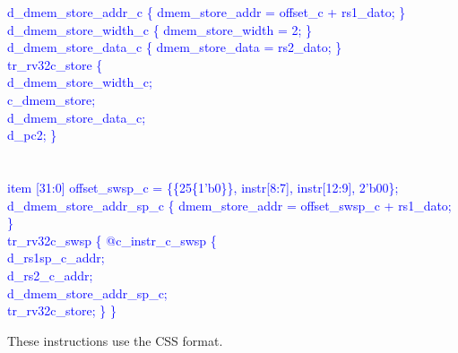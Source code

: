 \textcolor{blue}{
\indent d\_dmem\_store\_addr\_c \{ dmem\_store\_addr = offset\_c + rs1\_dato; \}\\%
\indent d\_dmem\_store\_width\_c \{ dmem\_store\_width = 2; \}\\%
\indent d\_dmem\_store\_data\_c \{ dmem\_store\_data = rs2\_dato; \}\\%
\indent tr\_rv32c\_store \{ \\%
\indent \hspace{\parindent} d\_dmem\_store\_width\_c; \\%
\indent \hspace{\parindent} c\_dmem\_store; \\%
\indent \hspace{\parindent} d\_dmem\_store\_data\_c; \\%
\indent \hspace{\parindent} d\_pc2; \}\\%
\\
\\
\indent item [31:0] offset\_swsp\_c = \{\{25\{1'b0\}\}, instr[8:7], instr[12:9], 2'b00\};\\%
\indent d\_dmem\_store\_addr\_sp\_c \{ dmem\_store\_addr = offset\_swsp\_c + rs1\_dato; \}\\%
\indent tr\_rv32c\_swsp \{ @c\_instr\_c\_swsp \{ \\%
\indent \hspace{\parindent} d\_rs1sp\_c\_addr; \\%
\indent \hspace{\parindent} d\_rs2\_c\_addr; \\%
\indent \hspace{\parindent} d\_dmem\_store\_addr\_sp\_c; \\%
\indent \hspace{\parindent} tr\_rv32c\_store; \} \} \\%
}

These instructions use the CSS format.

